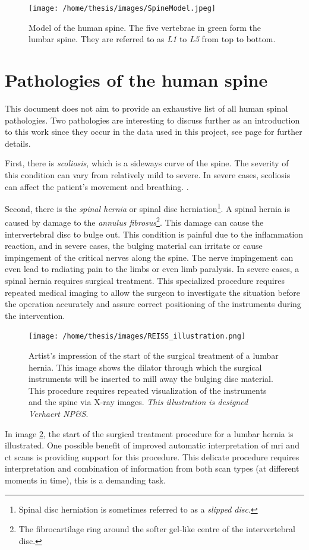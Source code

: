 \begin{figure}
    \centering
    \texttt{[image: /home/thesis/images/SpineModel.jpeg]}
    \caption{\label{fig:spineimage}Model of the human spine. The five vertebrae in green form the lumbar spine. They are referred to as \textit{L1} to \textit{L5} from top to bottom. }
\end{figure}

\section{Pathologies of the human spine}
\par{
    This document does not aim to provide an exhaustive list of all human spinal pathologies. 
    Two pathologies are interesting to discuss further as an introduction to this work since they occur in the data used in this project, see page \pageref{sec:datasets} for further details.
}
\par{
    First, there is \textit{scoliosis}, which is a sideways curve of the spine.
    The severity of this condition can vary from relatively mild to severe. 
    In severe cases, scoliosis can affect the patient's movement and breathing.
    .
}
\par{
    Second, there is the \textit{spinal hernia} or spinal disc herniation\footnote{Spinal disc herniation is sometimes referred to as a \textit{slipped disc}.}. 
    A spinal hernia is caused by damage to the \textit{annulus fibrosus}\footnote{The fibrocartilage ring around the softer gel-like centre of the intervertebral disc.}. 
    This damage can cause the intervertebral disc to bulge out. 
    This condition is painful due to the inflammation reaction, and in severe cases, the bulging material can irritate or cause impingement of the critical nerves along the spine.
    The nerve impingement can even lead to radiating pain to the limbs or even limb paralysis.
    In severe cases, a spinal hernia requires surgical treatment.
    This specialized procedure requires repeated medical imaging to allow the surgeon to investigate the situation before the operation accurately and assure correct positioning of the instruments during the intervention.
}
\begin{figure}
    \centering
    \texttt{[image: /home/thesis/images/REISS\_illustration.png]}
    \caption{Artist's impression of the start of the surgical treatment of a lumbar hernia. 
    This image shows the dilator through which the surgical instruments will be inserted to mill away the bulging disc material.
    This procedure requires repeated visualization of the instruments and the spine via X-ray images. \textit{This illustration is designed Verhaert NP\&S}.\label{fig:REISS_procedure}}
\end{figure}
\par{
    In image \ref{fig:REISS_procedure}, the start of the surgical treatment procedure for a lumbar hernia is illustrated.
    One possible benefit of improved automatic interpretation of \acrshort{mri} and \acrshort{ct} scans is providing support for this procedure.
    This delicate procedure requires interpretation and combination of information from both scan types (at different moments in time), this is a demanding task.
}

